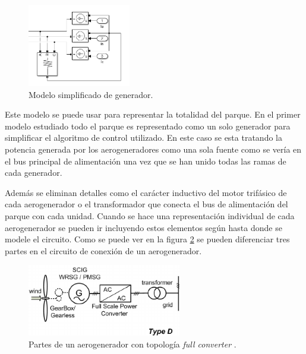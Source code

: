\documentclass{book}
\begin{document}
\begin{figure}[h!]
\centering
\includegraphics[width=0.4\textwidth]{SimpleGenerator.PNG}
\caption{Modelo simplificado de generador. }
\label{SimpleGenerator}
\end{figure} \par

Este modelo se puede usar para representar la totalidad del parque. En el primer modelo estudiado todo el parque es representado como un solo generador para simplificar el algoritmo de control utilizado. En este caso se esta tratando la potencia generada por los aerogeneradores como una sola fuente como se ver\'ia en el bus principal de alimentaci\'on una vez que se han unido todas las ramas de cada generador. \par

Adem\'as se eliminan detalles como el car\'acter inductivo del motor trif\'asico de cada aerogenerador o el transformador que conecta el bus de alimentaci\'on del parque con cada unidad. Cuando se hace una representaci\'on individual de cada aerogenerador se pueden ir incluyendo estos elementos seg\'un hasta donde se modele el circuito. Como se puede ver en la figura \ref{FullConverter} se pueden diferenciar tres partes en el circuito de conexi\'on de un aerogenerador. 

\begin{figure}[h!]
\centering
\includegraphics[width=0.6\textwidth]{FullConverter.PNG}
\caption{Partes de un aerogenerador con topolog\'ia \emph{full converter} \cite{FullConFig}. }
\label{FullConverter}
\end{figure} \par
\end{document}
